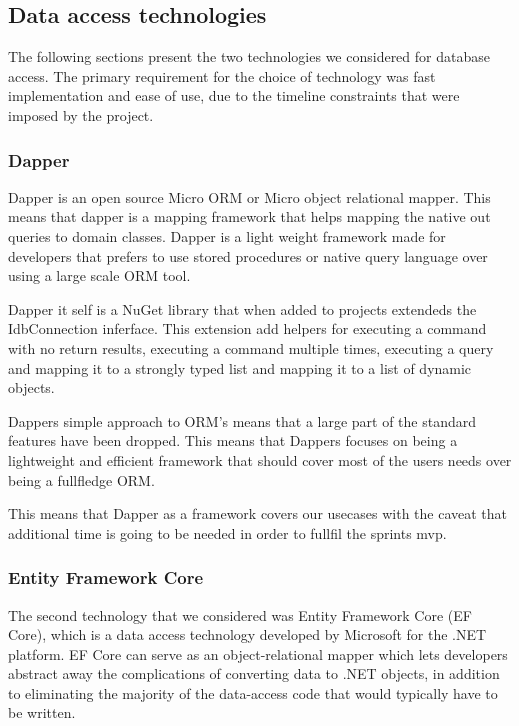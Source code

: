 \subsection{Data access technologies}
The following sections present the two technologies we considered for database access.
The primary requirement for the choice of technology was fast implementation and ease of use, due to the timeline constraints that were imposed by the \knox{} project. 

\subsubsection{Dapper}
Dapper is an open source Micro ORM or Micro object relational mapper. This means that dapper is a mapping framework that helps mapping the native out queries to domain classes. Dapper is a light weight framework made for developers that prefers to use stored procedures or native query language over using a large scale ORM tool. 

Dapper it self is a NuGet library that when added to projects extendeds the IdbConnection inferface. This extension add helpers for executing a command with no return results, executing a command multiple times, executing a query and mapping it to a strongly typed list and mapping it to a list of dynamic objects. \cite{Dapper_Git}

Dappers simple approach to ORM's means that a large part of the standard features have been dropped. This means that Dappers focuses on being a lightweight and efficient framework that should cover most of the users needs over being a fullfledge ORM.\cite{Dapper_Git} 

This means that Dapper as a framework covers our usecases with the caveat that additional time is going to be needed in order to fullfil the sprints mvp. 

\subsubsection{Entity Framework Core}
The second technology that we considered was Entity Framework Core (EF Core), which is a data access technology developed by Microsoft for the .NET platform. EF Core can serve as an object-relational mapper \cite{Object_relational_mapping} which lets developers abstract away the complications of converting data to .NET objects, in addition to eliminating the majority of the data-access code that would typically have to be written.

